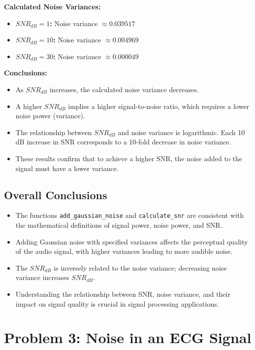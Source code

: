 \documentclass[10pt]{article}
\theoremstyle{definition}
\theoremstyle{remark}
\theoremstyle{definition}
\numberwithin{equation}{prob}
\begin{document}
\textbf{Calculated Noise Variances:}

\begin{itemize}
    \item \textbf{\( SNR_{dB} = 1 \):} Noise variance \( \approx 0.039517 \)
    \item \textbf{\( SNR_{dB} = 10 \):} Noise variance \( \approx 0.004969 \)
    \item \textbf{\( SNR_{dB} = 30 \):} Noise variance \( \approx 0.000049 \)
\end{itemize}

\textbf{Conclusions:}

\begin{itemize}
    \item As \( SNR_{dB} \) increases, the calculated noise variance decreases.
    \item A higher \( SNR_{dB} \) implies a higher signal-to-noise ratio, which requires a lower noise power (variance).
    \item The relationship between \( SNR_{dB} \) and noise variance is logarithmic. Each 10 dB increase in SNR corresponds to a 10-fold decrease in noise variance.
    \item These results confirm that to achieve a higher SNR, the noise added to the signal must have a lower variance.
\end{itemize}

\subsection{Overall Conclusions}

\begin{itemize}
    \item The functions \texttt{add\_gaussian\_noise} and \texttt{calculate\_snr} are consistent with the mathematical definitions of signal power, noise power, and SNR.
    \item Adding Gaussian noise with specified variances affects the perceptual quality of the audio signal, with higher variances leading to more audible noise.
    \item The \( SNR_{dB} \) is inversely related to the noise variance; decreasing noise variance increases \( SNR_{dB} \).
    \item Understanding the relationship between SNR, noise variance, and their impact on signal quality is crucial in signal processing applications.
\end{itemize}

\section{Problem 3: Noise in an ECG Signal}
\end{document}
